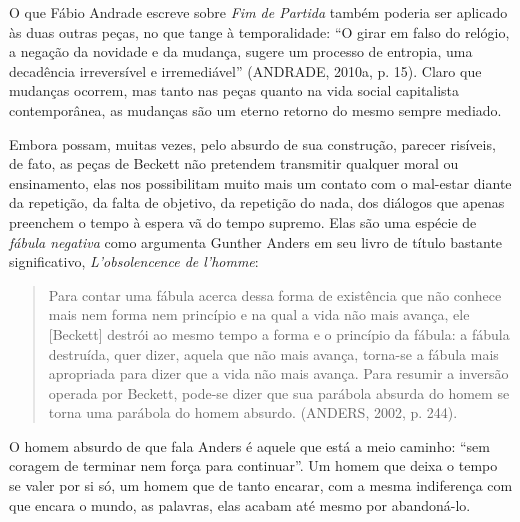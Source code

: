 O que Fábio Andrade escreve sobre \emph{Fim de Partida} também poderia
ser aplicado às duas outras peças, no que tange à temporalidade: ``O
girar em falso do relógio, a negação da novidade e da mudança, sugere um
processo de entropia, uma decadência irreversível e irremediável''
(ANDRADE, 2010a, p. 15). Claro que mudanças ocorrem, mas tanto nas peças
quanto na vida social capitalista contemporânea, as mudanças são um
eterno retorno do mesmo sempre mediado.

Embora possam, muitas vezes, pelo absurdo de sua construção, parecer
risíveis, de fato, as peças de Beckett não pretendem transmitir qualquer
moral ou ensinamento, elas nos possibilitam muito mais um contato com o
mal-estar diante da repetição, da falta de objetivo, da repetição do
nada, dos diálogos que apenas preenchem o tempo à espera vã do tempo
supremo. Elas são uma espécie de \emph{fábula negativa} como argumenta
Gunther Anders em seu livro de título bastante significativo,
\emph{L'obsolencence de l'homme}:

\begin{quote}
Para contar uma fábula acerca dessa forma de existência que não conhece
mais nem forma nem princípio e na qual a vida não mais avança, ele
{[}Beckett{]} destrói ao mesmo tempo a forma e o princípio da fábula: a
fábula destruída, quer dizer, aquela que não mais avança, torna-se a
fábula mais apropriada para dizer que a vida não mais avança. Para
resumir a inversão operada por Beckett, pode-se dizer que sua parábola
absurda do homem se torna uma parábola do homem absurdo. (ANDERS, 2002,
p. 244).
\end{quote}

O homem absurdo de que fala Anders é aquele que está a meio caminho:
``sem coragem de terminar nem força para continuar''. Um homem que deixa
o tempo se valer por si só, um homem que de tanto encarar, com a mesma
indiferença com que encara o mundo, as palavras, elas acabam até mesmo
por abandoná-lo.

